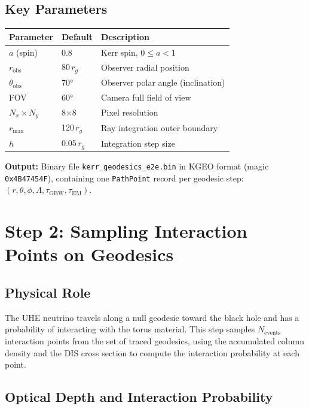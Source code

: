 \documentclass[11pt,a4paper]{article}
\begin{document}
\subsection{Key Parameters}

\begin{center}
\begin{tabular}{lll}
\toprule
Parameter & Default & Description \\
\midrule
$a$ (spin) & 0.8 & Kerr spin, $0 \le a < 1$ \\
$r_\mathrm{obs}$ & 80\,$r_g$ & Observer radial position \\
$\theta_\mathrm{obs}$ & 70° & Observer polar angle (inclination) \\
FOV & 60° & Camera full field of view \\
$N_x \times N_y$ & 8$\times$8 & Pixel resolution \\
$r_\mathrm{max}$ & 120\,$r_g$ & Ray integration outer boundary \\
$h$ & 0.05\,$r_g$ & Integration step size \\
\bottomrule
\end{tabular}
\end{center}

\textbf{Output:} Binary file \texttt{kerr\_geodesics\_e2e.bin} in KGEO format (magic \texttt{0x4B47454F}), containing one \texttt{PathPoint} record per geodesic step: $(r,\theta,\phi,\Lambda,\tau_\mathrm{GBW},\tau_\mathrm{IIM})$.

\section{Step 2: Sampling Interaction Points on Geodesics}
\label{sec:interaction_points}

\subsection{Physical Role}

The UHE neutrino travels along a null geodesic toward the black hole and has a probability of interacting with the torus material. This step samples $N_\mathrm{events}$ interaction points from the set of traced geodesics, using the accumulated column density and the DIS cross section to compute the interaction probability at each point.

\subsection{Optical Depth and Interaction Probability}
\end{document}
